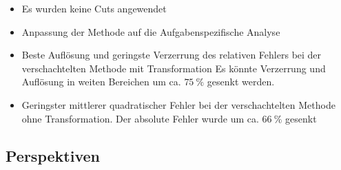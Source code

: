 \documentclass[aspectratio=1610, professionalfonts, 9pt]{beamer}
\begin{document}
\begin{frame}
\begin{columns}
\begin{figure}
      \end{figure}
    \end{columns}
    \begin{itemize}
      \item Es wurden keine Cuts angewendet
      \item Anpassung der Methode auf die Aufgabenspezifische Analyse
      \item Beste Auflösung und geringste Verzerrung des relativen Fehlers bei der verschachtelten Methode mit Transformation
            Es könnte Verzerrung und Auflösung in weiten Bereichen um ca. $\SI{75}{\percent}$ gesenkt werden.
      \item Geringster mittlerer quadratischer Fehler bei der verschachtelten Methode ohne Transformation.
            Der absolute Fehler wurde um ca. $\SI{66}{\percent}$ gesenkt
    \end{itemize}
  \end{frame}

  \subsection{Perspektiven}
\end{document}

